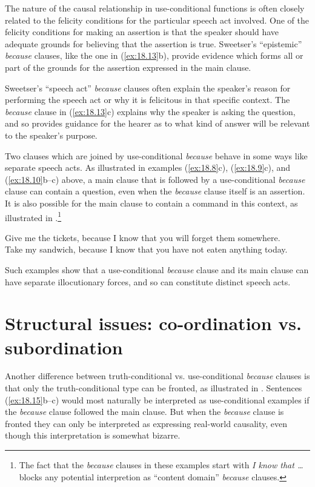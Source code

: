 The nature of the causal relationship in use-conditional functions is often closely related to the felicity conditions for the particular speech act involved. One of the felicity conditions for making an assertion is that the speaker should have adequate grounds for believing that the assertion is true. Sweetser’s “epistemic” \textit{because} clauses, like the one in (\ref{ex:18.13}b), provide evidence which forms all or part of the grounds for the assertion expressed in the main clause.



Sweetser’s “speech act” \textit{because} clauses often explain the speaker’s reason for performing the speech act or why it is felicitous in that specific context. The \textit{because} clause in (\ref{ex:18.13}c) explains why the speaker is asking the question, and so provides guidance for the hearer as to what kind of answer will be relevant to the speaker’s purpose.



Two clauses which are joined by use-conditional \textit{because} behave in some ways like separate speech acts. As illustrated in examples (\ref{ex:18.8}c), (\ref{ex:18.9}c), and (\ref{ex:18.10}b--c) above, a main clause that is followed by a use-conditional \textit{because} clause can contain a question, even when the \textit{because} clause itself is an assertion. It is also possible for the main clause to contain a command in this context, as illustrated in .\footnote{The fact that the \textit{because} clauses in these examples start with \textit{I know that …} blocks any potential interpretion as “content domain” \textit{because} clauses.}


\ea \label{ex:18.14}
\ea  Give me the tickets, because I know that you will forget them somewhere.\\
\ex Take my sandwich, because I know that you have not eaten anything today.
                       \z
\z


Such examples show that a use-conditional \textit{because} clause and its main clause can have separate illocutionary forces, and so can constitute distinct speech acts.


\section{Structural issues: co-ordination vs. subordination}\label{sec:18.4}

Another difference between truth-conditional vs. use-conditional \textit{because} clauses is that only the truth-conditional type can be fronted, as illustrated in . Sentences (\ref{ex:18.15}b--c) would most naturally be interpreted as use-conditional examples if the \textit{because} clause followed the main clause. But when the \textit{because} clause is fronted they can only be interpreted as expressing real-world causality, even though this interpretation is somewhat bizarre.


